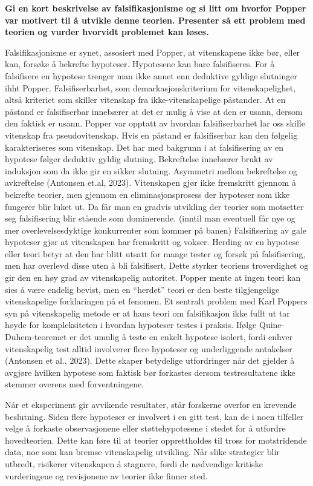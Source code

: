 \documentclass[
  letterpaper,
  DIV=11,
  numbers=noendperiod]{scrreprt}
\begin{document}
\textbf{Gi en kort beskrivelse av falsifikasjonisme og si litt om
hvorfor Popper var motivert til å utvikle denne teorien. Presenter så
ett problem med teorien og vurder hvorvidt problemet kan løses.}

Falsifikasjonisme er synet, assosiert med Popper, at vitenskapene ikke
bør, eller kan, forsøke å bekrefte hypoteser. Hypotesene kan bare
falsifiseres. For å falsifisere en hypotese trenger man ikke annet enn
deduktive gyldige slutninger ihht Popper. Falsifiserbarhet, som
demarkasjonskriterium for vitenskapelighet, altså kriteriet som skiller
vitenskap fra ikke-vitenskapelige påstander. At en påstand er
falsifiserbar innebærer at det er mulig å vise at den er usann, dersom
den faktisk er usann. Popper var opptatt av hvordan falsifiserbarhet lar
oss skille vitenskap fra pseudovitenskap. Hvis en påstand er
falsifiserbar kan den følgelig karakteriseres som vitenskap. Det har med
bakgrunn i at falsifisering av en hypotese følger deduktiv gyldig
slutning. Bekreftelse innebærer brukt av induksjon som da ikke gir en
sikker slutning. Asymmetri mellom bekreftelse og avkreftelse (Antonsen
et.al, 2023). Vitenskapen gjør ikke fremskritt gjennom å bekrefte
teorier, men gjennom en eliminasjonsprosess der hypoteser som ikke
fungerer blir luket ut. Da får man en gradvis utvikling der teorier som
motsetter seg falsifisering blir stående som dominerende. (inntil man
eventuell får nye og mer overlevelsesdyktige konkurrenter som kommer på
banen) Falsifisering av gale hypoteser gjør at vitenskapen har
fremskritt og vokser. Herding av en hypotese eller teori betyr at den
har blitt utsatt for mange tester og forsøk på falsifisering, men har
overlevd disse uten å bli falsifisert. Dette styrker teoriens
troverdighet og gir den en høy grad av vitenskapelig autoritet. Popper
mente at ingen teori kan sies å være endelig bevist, men en ``herdet''
teori er den beste tilgjengelige vitenskapelige forklaringen på et
fenomen. Et sentralt problem med Karl Poppers syn på vitenskapelig
metode er at hans teori om falsifikasjon ikke fullt ut tar høyde for
kompleksiteten i hvordan hypoteser testes i praksis. Ifølge
Quine-Duhem-teoremet er det umulig å teste en enkelt hypotese isolert,
fordi enhver vitenskapelig test alltid involverer flere hypoteser og
underliggende antakelser (Antonsen et al., 2023). Dette skaper
betydelige utfordringer når det gjelder å avgjøre hvilken hypotese som
faktisk bør forkastes dersom testresultatene ikke stemmer overens med
forventningene.

Når et eksperiment gir avvikende resultater, står forskerne overfor en
krevende beslutning. Siden flere hypoteser er involvert i en gitt test,
kan de i noen tilfeller velge å forkaste observasjonene eller
støttehypotesene i stedet for å utfordre hovedteorien. Dette kan føre
til at teorier opprettholdes til tross for motstridende data, noe som
kan bremse vitenskapelig utvikling. Når slike strategier blir utbredt,
risikerer vitenskapen å stagnere, fordi de nødvendige kritiske
vurderingene og revisjonene av teorier ikke finner sted.
\end{document}
